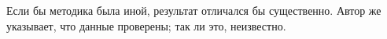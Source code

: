 Если бы методика была иной, результат отличался бы существенно. %
Автор же указывает, что данные проверены; так ли это, неизвестно. %
